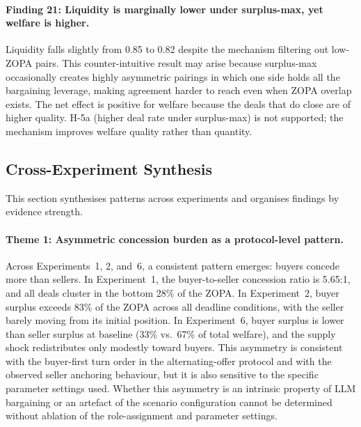 \paragraph{Finding 21: Liquidity is marginally lower under surplus-max, yet welfare is higher.}
Liquidity falls slightly from 0.85 to 0.82 despite the mechanism filtering out low-ZOPA pairs.  This counter-intuitive result may arise because surplus-max occasionally creates highly asymmetric pairings in which one side holds all the bargaining leverage, making agreement harder to reach even when ZOPA overlap exists.  The net effect is positive for welfare because the deals that do close are of higher quality.  H-5a (higher deal rate under surplus-max) is not supported; the mechanism improves welfare quality rather than quantity.


\subsection{Cross-Experiment Synthesis}
\label{sec:results-cross}

This section synthesises patterns across experiments and organises findings by evidence strength.

\paragraph{Theme 1: Asymmetric concession burden as a protocol-level pattern.}
Across Experiments~1, 2, and~6, a consistent pattern emerges: buyers concede more than sellers.  In Experiment~1, the buyer-to-seller concession ratio is 5.65:1, and all deals cluster in the bottom 28\% of the ZOPA.  In Experiment~2, buyer surplus exceeds 83\% of the ZOPA across all deadline conditions, with the seller barely moving from its initial position.  In Experiment~6, buyer surplus is lower than seller surplus at baseline (33\% vs.\ 67\% of total welfare), and the supply shock redistributes only modestly toward buyers.  This asymmetry is consistent with the buyer-first turn order in the alternating-offer protocol and with the observed seller anchoring behaviour, but it is also sensitive to the specific parameter settings used.  Whether this asymmetry is an intrinsic property of LLM bargaining or an artefact of the scenario configuration cannot be determined without ablation of the role-assignment and parameter settings.

